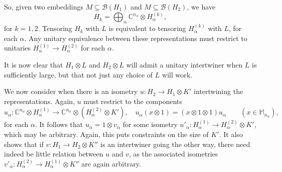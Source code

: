 \documentclass[a4paper,11pt]{article}
\theoremstyle{plain}
\theoremstyle{remark}
\newcommand{\mc}[1]{\mathcal{#1}}
\begin{document}
So, given two embeddings $M\subseteq \mc B(H_1)$ and $M\subseteq\mc B(H_2)$, we have
\[ H_k = \bigoplus_\alpha \mathbb C^{n_\alpha} \otimes H_\alpha^{(k)}, \]
for $k=1,2$.  Tensoring $H_k$ with $L$ is equivalent to tensoring $H_\alpha^{(k)}$ with $L$, for each $\alpha$.  Any unitary equivalence between these representations must restrict to unitaries $H^{(1)}_\alpha \to H^{(2)}_\alpha$ for each $\alpha$.

It is now clear that $H_1\otimes L$ and $H_2\otimes L$ will admit a unitary intertwiner when $L$ is sufficiently large, but that not just any choice of $L$ will work.

We now consider when there is an isometry $u\colon H_2 \to H_1\otimes K'$ intertwining the representations.  Again, $u$ must restrict to the components
\[ u_\alpha \colon \mathbb C^{n_\alpha} \otimes H_\alpha^{(1)} \to
\mathbb C^{n_\alpha} \otimes (H_\alpha^{(2)} \otimes K'), \quad
u_\alpha(x\otimes 1) = (x\otimes 1\otimes 1)u_\alpha \qquad (x\in\mathbb M_{n_\alpha}), \]
for each $\alpha$.  It follows that $u_\alpha = 1\otimes v_\alpha$ for some isometry $u'_\alpha \colon H_\alpha^{(1)} \to H_\alpha^{(2)} \otimes K'$, which may be arbitrary.  Again, this puts constraints on the size of $K'$.  It also shows that if $v\colon H_1 \to H_2\otimes K''$ is an intertwiner going the other way, there need indeed be little relation between $u$ and $v$, as the associated isometries $v'_\alpha \colon H^{(2)}_\alpha \to H^{(1)}_\alpha \otimes K''$ are again arbitrary.



\end{document}
